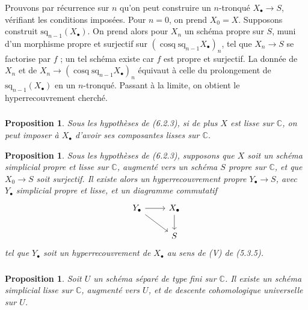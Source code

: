 \documentclass[11pt]{amsart}
\theoremstyle{plain}
\newtheorem{proposition}[theorem]{Proposition}
\theoremstyle{definition}
\DeclareMathOperator{\cosq}{cosq}
\newcommand{\CC}{\mathbb{C}}
\begin{document}
Prouvons par r\'ecurrence sur $n$ qu'on peut construire un $n$-tronqu\'e $X_\bullet \to S$, v\'erifiant les conditions impos\'ees. Pour $n=0$, on prend $X_0 = X$. Supposons construit $\mathrm{sq}_{n-1}(X_\bullet)$. On prend alors pour $X_n$ un sch\'ema propre sur $S$, muni d'un morphisme propre et surjectif sur $(\cosq \mathrm{sq}_{n-1} X_\bullet)_n$, tel que $X_n \to S$ se factorise par $f$ ; un tel sch\'ema existe car $f$ est propre et surjectif. La donn\'ee de $X_n$ et de $X_n \to (\cosq \mathrm{sq}_{n-1} X_\bullet)_n$ \'equivaut \`a celle du prolongement de $\mathrm{sq}_{n-1}(X_\bullet)$ en un $n$-tronqu\'e. Passant \`a la limite, on obtient le hyperrecouvrement cherch\'e.

\subsubsection{}
\begin{proposition}
Sous les hypoth\`eses de (6.2.3), si de plus $X$ est lisse sur $\CC$, on peut imposer \`a $X_\bullet$ d'avoir ses composantes lisses sur $\CC$.
\end{proposition}

\begin{proposition}
Sous les hypoth\`eses de (6.2.3), supposons que $X$ soit un sch\'ema simplicial propre et lisse sur $\CC$, augment\'e vers un sch\'ema $S$ propre sur $\CC$, et que $X_0 \to S$ soit surjectif. Il existe alors un hyperrecouvrement propre $Y_\bullet \to S$, avec $Y_\bullet$ simplicial propre et lisse, et un diagramme commutatif
\[
\begin{tikzcd}
Y_\bullet \arrow[r] \arrow[rd] & X_\bullet \arrow[d] \\
& S
\end{tikzcd}
\]
tel que $Y_\bullet$ soit un hyperrecouvrement de $X_\bullet$ au sens de (V) de (5.3.5).
\end{proposition}

\subsubsection{}
\begin{proposition}
Soit $U$ un sch\'ema s\'epar\'e de type fini sur $\CC$. Il existe un sch\'ema simplicial lisse sur $\CC$, augment\'e vers $U$, et de descente cohomologique universelle sur $U$.
\end{proposition}
\end{document}
